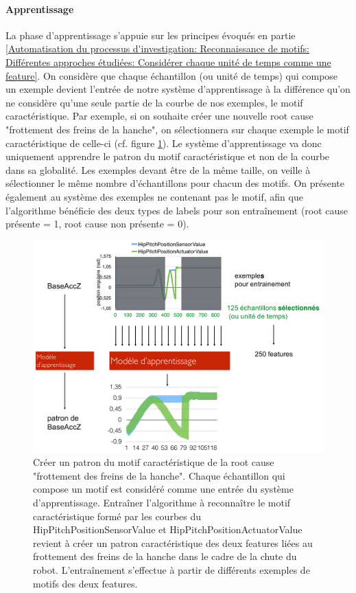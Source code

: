\paragraph{Apprentissage} La phase d'apprentissage s'appuie sur les principes évoqués en partie \ref{Automatisation du processus d'investigation: Reconnaissance de motifs: Différentes approches étudiées: Considérer chaque unité de temps comme une feature}. On considère que chaque échantillon (ou unité de temps) qui compose un exemple devient l'entrée de notre système d'apprentissage à la différence qu'on ne considère qu'une seule partie de la courbe de nos exemples, le motif caractéristique. Par exemple, si on souhaite créer une nouvelle root cause "frottement des freins de la hanche", on sélectionnera sur chaque exemple le motif caractéristique de celle-ci (cf. figure \ref{fig:Créer un patron du motif caractéristique de la root cause "frottement des freins de la hanche"}). Le système d'apprentissage va donc uniquement apprendre le patron du motif caractéristique et non de la courbe dans sa globalité. Les exemples devant être de la même taille, on veille à sélectionner le même nombre d'échantillons pour chacun des motifs. On présente également au système des exemples ne contenant pas le motif, afin que l'algorithme bénéficie des deux types de labels pour son entraînement (root cause présente = 1, root cause non présente = 0).

\begin{figure}[h]
	\centering\includegraphics[width=15cm]{images/patron_motif.png}
	\caption[Créer un patron du motif caractéristique de la root cause "frottement des freins de la hanche"]{Créer un patron du motif caractéristique de la root cause "frottement des freins de la hanche". Chaque échantillon qui compose un motif est considéré comme une entrée du système d'apprentissage. Entraîner l'algorithme à reconnaître le motif caractéristique formé par les courbes du HipPitchPositionSensorValue et HipPitchPositionActuatorValue revient à créer un patron caractéristique des deux features liées au frottement des freins de la hanche dans le cadre de la chute du robot. L'entraînement s'effectue à partir de différents exemples de motifs des deux features.}
	\label{fig:Créer un patron du motif caractéristique de la root cause "frottement des freins de la hanche"}
\end{figure}

